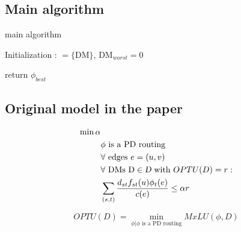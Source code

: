 \documentclass{ctexart}
\begin{document}
\subsection{Main algorithm} 
\begin{algorithm}[H]
    \SetAlgoLined 
	\caption{main algorithm}%
	Initialization :  $ = \{\text{DM}\} $, DM$_{worst} = 0 $\; 

	return $\phi_{best}$
\end{algorithm}

\subsection{Original model in the paper} 
\begin{equation}
	\begin{aligned}
		\min \alpha & \\
		& \phi \text{ is a PD routing}\\
		& \forall \text{ edges }e=(u,v) \\
		& \forall \text{ DMs D}\in \text{\sl D}\text{ with }OPTU(D)=r:\\
		& \sum_{(s,t)}\frac{d_{st}f_{st}(u)\phi_t(e)}{c(e)}\leq\alpha r
	\end{aligned}
\end{equation}

\begin{equation}
	OPTU(D)=\min_{\phi|\phi\text{ is a PD routing}} MxLU(\phi,D)
\end{equation}
\end{document}
